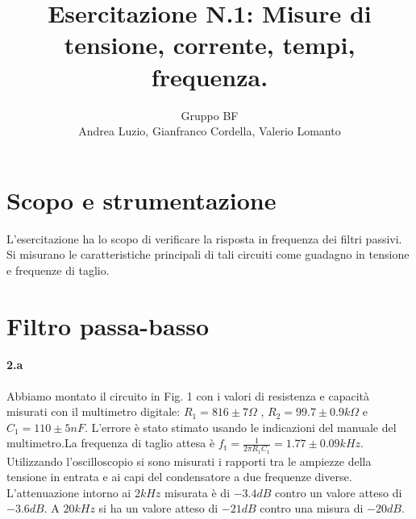 \documentclass[10pt,a4paper]{article}
\author{Gruppo BF \\ Andrea Luzio, Gianfranco Cordella, Valerio Lomanto}
\title{Esercitazione N.1: Misure di tensione, corrente, tempi, frequenza.}
\begin{document}
\maketitle

\section{Scopo e strumentazione}

L'esercitazione ha lo scopo di verificare la risposta in frequenza dei filtri passivi. Si misurano le caratteristiche principali di tali circuiti come guadagno in tensione e frequenze di taglio.

\section{Filtro passa-basso}
\paragraph{2.a }
Abbiamo montato il circuito in Fig. 1 con i valori di resistenza e capacità misurati con il multimetro digitale: $R_1 = 816\pm 7 \Omega$ , $R_2 = 99.7\pm 0.9 k\Omega$ e $C_1 = 110\pm 5 nF$. L'errore è stato stimato usando le indicazioni del manuale del multimetro.La frequenza di taglio attesa è $f_\mathrm{t}= \frac{1}{2\pi R_1C_1}= 1.77 \pm 0.09 kHz $.
Utilizzando l'oscilloscopio si sono misurati i rapporti tra le ampiezze della tensione in entrata e ai capi del condensatore a due frequenze diverse.
L'attenuazione intorno ai $2 kHz$ misurata è di $-3.4 dB$ contro un valore atteso di $-3.6 dB$. A $20 kHz$ si ha un valore atteso di $-21 dB$ contro una misura di $-20 dB$. 
\end{document}
